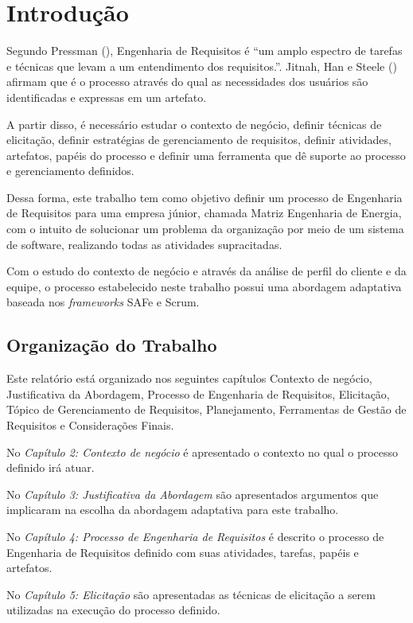 \chapter[Introdução]{Introdução}

Segundo Pressman (\citeyear{pressman}), Engenharia de Requisitos é ``um amplo
espectro de tarefas e técnicas que levam a um entendimento dos requisitos.''.
Jitnah, Han e Steele (\citeyear{jitnah}) afirmam que é o processo através do qual as necessidades dos usuários 
são identificadas e expressas em um artefato.

A partir disso, é necessário estudar o contexto de negócio, definir técnicas de elicitação, 
definir estratégias de gerenciamento de requisitos, definir atividades, artefatos, papéis do processo
e definir uma ferramenta que dê suporte ao processo e gerenciamento definidos.

Dessa forma, este trabalho tem como objetivo definir um processo de Engenharia de Requisitos para uma empresa júnior, chamada
Matriz Engenharia de Energia, com o intuito de solucionar um problema da organização por meio de um sistema de software,
realizando todas as atividades supracitadas.

Com o estudo do contexto de negócio e através da análise de perfil do cliente e da equipe, o processo
estabelecido neste trabalho possui uma abordagem adaptativa baseada nos \textit{frameworks} SAFe e Scrum.

\section{Organização do Trabalho}

Este relatório está organizado nos seguintes capítulos Contexto de negócio, Justificativa da Abordagem, 
Processo de Engenharia de Requisitos, Elicitação, Tópico de Gerenciamento de Requisitos,
Planejamento, Ferramentas de Gestão de Requisitos e Considerações Finais.

No \textit{Capítulo 2: Contexto de negócio} é apresentado o contexto no qual o processo
definido irá atuar.

No \textit{Capítulo 3: Justificativa da Abordagem} são apresentados argumentos
que implicaram na escolha da abordagem adaptativa para este trabalho.

No \textit{Capítulo 4: Processo de Engenharia de Requisitos} é descrito o processo de Engenharia
de Requisitos definido com suas atividades, tarefas, papéis e artefatos.

No \textit{Capítulo 5: Elicitação} são apresentadas as técnicas de elicitação
a serem utilizadas na execução do processo definido.

